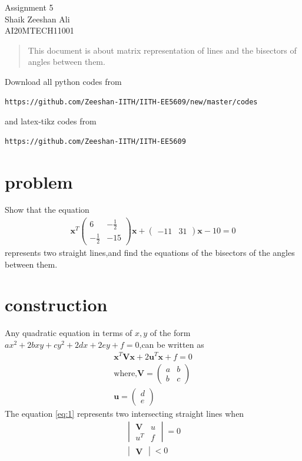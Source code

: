 \documentclass[journal,12pt,twocolumn]{IEEEtran}
\newcommand{\myvec}[1]{\ensuremath{\begin{pmatrix}#1\end{pmatrix}}}
\newcommand{\mydet}[1]{\ensuremath{\begin{vmatrix}#1\end{vmatrix}}}
\numberwithin{equation}{subsection}
\let\vec\mathbf
\begin{document}
\begin{center}
\huge Assignment 5\\

\large Shaik Zeeshan Ali\\
\large AI20MTECH11001\\
\end{center}
\begin{abstract}
This document is about matrix representation of lines and the bisectors of angles between them.
\end{abstract}
Download all python codes from 
\begin{lstlisting}
https://github.com/Zeeshan-IITH/IITH-EE5609/new/master/codes
\end{lstlisting}

and latex-tikz codes from 
\begin{lstlisting}
https://github.com/Zeeshan-IITH/IITH-EE5609
\end{lstlisting}
\section{problem}
Show that the equation 
\begin{align}
    \vec{x}^T\myvec{6&-\frac{1}{2}\\-\frac{1}{2}&-15}\vec{x}+\myvec{-11& 31}\vec{x}-10=0\label{eq:1}
\end{align}
represents two straight lines,and find the equations of the bisectors of the angles between them.
\section{construction}
Any quadratic equation in terms of $x,y$ of the form $ax^2+2bxy+cy^2+2dx+2ey+f=0$,can be written as
\begin{align}
    \vec{x}^T\vec{V}\vec{x}+2\vec{u}^T\vec{x}+f=0\label{eq:2}\\
    \text{where,}
    \vec{V}=\myvec{a&b\\b&c}\\
    \vec{u}=\myvec{d\\e}
\end{align}
The equation \eqref{eq:1} represents two intersecting straight lines when
\begin{align}
    \mydet{\vec{V} & u\\u^T &f}=0\label{eq:2}\\
    \mydet{\vec{V}}<0
\end{align}
\end{document}
